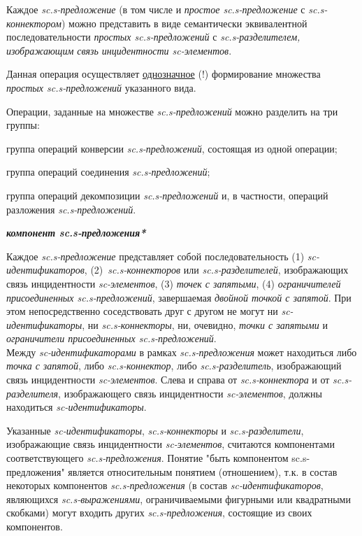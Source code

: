 \begin{textitemize}
{		Каждое \textit{sc.s-предложение} (в том числе и \textit{простое sc.s-предложение} с \textit{sc.s-коннектором}) можно представить в виде семантически эквивалентной последовательности \textit{простых \mbox{sc.s-предложений}} с \textit{sc.s-разделителем, изображающим связь инцидентности \mbox{sc-элементов}}.
		
		Данная операция осуществляет \uline{однозначное} (!) формирование множества \textit{простых \mbox{sc.s-предложений}} указанного вида.}
\end{textitemize}

Операции, заданные на множестве \textit{sc.s-предложений} можно разделить на три группы:
\begin{textitemize}
	\item группа операций конверсии \textit{sc.s-предложений}, состоящая из одной операции;
	\item группа операций соединения \textit{sc.s-предложений};
	\item группа операций декомпозиции \textit{sc.s-предложений} и, в частности, операций разложения \textit{sc.s-предложений}.
\end{textitemize}


\bigskip
\textbf{\textit{компонент sc.s-предложения*}}

Каждое \textit{sc.s-предложение} представляет собой последовательность (1) \textit{sc-идентификаторов}, \mbox{(2) \textit{sc.s-коннекторов}} или \textit{sc.s-разделителей}, изображающих связь инцидентности \textit{sc-элементов}, (3) \textit{точек с запятыми}, (4) \textit{ограничителей присоединенных sc.s-предложений}, завершаемая \textit{двойной точкой с запятой}. При этом непосредственно соседствовать друг с другом не могут ни \textit{\mbox{sc-идентификаторы}}, ни \textit{\mbox{sc.s-коннекторы}}, ни, очевидно, \textit{точки с запятыми} и \textit{ограничители присоединенных sc.s-предложений}.\\
Между \textit{sc-идентификаторами} в рамках \textit{sc.s-предложения} может находиться либо \textit{точка с запятой}, либо \textit{sc.s-коннектор}, либо \textit{sc.s-разделитель}, изображающий связь инцидентности \textit{sc-элементов}. Слева и справа от \textit{sc.s-коннектора} и от \textit{sc.s-разделителя}, изображающего связь инцидентности \textit{sc-элементов}, должны находиться \textit{sc-идентификаторы}.

Указанные \textit{sc-идентификаторы}, \textit{sc.s-коннекторы} и \textit{sc.s-разделители}, изображающие связь инцидентности \textit{sc-элементов}, считаются компонентами соответствующего \textit{sc.s-предложения}. Понятие "быть компонентом sc.s-предложения"{} является относительным понятием (отношением), т.к. в состав некоторых компонентов \textit{sc.s-предложения} (в состав \textit{sc-идентификаторов}, являющихся \textit{sc.s-выражениями}, ограничиваемыми фигурными или квадратными скобками) могут входить других \textit{sc.s-предложения}, состоящие из своих компонентов.

